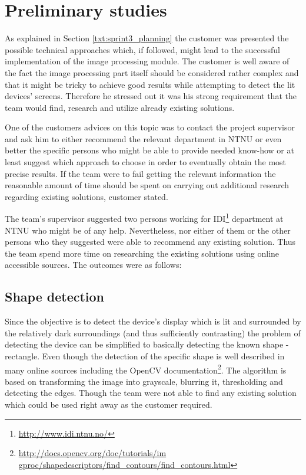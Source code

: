 \section{Preliminary studies}
As explained in Section \ref{txt:sprint3_planning} the customer was presented the possible technical approaches which, if followed, might lead to the successful implementation of the image processing module. The customer is well aware of the fact the image processing part itself should be considered rather complex and that it might be tricky to achieve good results while attempting to detect the lit devices' screens. Therefore he stressed out it was his strong requirement that the team would find, research and utilize already existing solutions.

One of the customers advices on this topic was to contact the project supervisor and ask him to either recommend the relevant department in NTNU or even better the specific persons who might be able to provide needed know-how or at least suggest which approach to choose in order to eventually obtain the most precise results. If the team were to fail getting the relevant information the reasonable amount of time should be spent on carrying out additional research regarding existing solutions, customer stated.

The team's supervisor suggested two persons working for IDI\footnote{\url{http://www.idi.ntnu.no/}} department at NTNU who might be of any help. Nevertheless, nor either of them or the other persons who they suggested were able to recommend any existing solution. Thus the team spend more time on researching the existing solutions using online accessible sources. The outcomes were as follows:

\subsection{Shape detection}
Since the objective is to detect the device's display which is lit and surrounded by the relatively dark surroundings (and thus sufficiently contrasting) the problem of detecting the device can be simplified to basically detecting the known shape - rectangle. Even though the detection of the specific shape is well described in many online sources including the OpenCV documentation\footnote{\url{http://docs.opencv.org/doc/tutorials/im
gproc/shapedescriptors/find_contours/find_contours.html}}. The algorithm is based on transforming the image into grayscale, blurring it, thresholding and detecting the edges. Though the team were not able to find any existing solution which could be used right away as the customer required.

